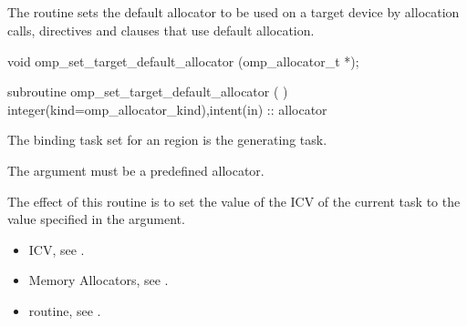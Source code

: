\ccppspecificstart

\subsection{}
\label{subsec:omp_set_target_default_allocator}

\summary
The  routine sets the default allocator to be used on a target device by allocation calls, directives and clauses that use default allocation.

\format
\ccppspecificstart
\begin{boxedcode}
void omp_set_target_default_allocator (omp_allocator_t *);
\end{boxedcode}
\ccppspecificend
\fortranspecificstart
\begin{boxedcode}
subroutine omp_set_target_default_allocator (  )
integer(kind=omp_allocator_kind),intent(in) :: allocator
\end{boxedcode}
\fortranspecificend
\binding
The binding task set for an  region is the generating task.

\constraints

The  argument must be a predefined allocator.

\effect

The effect of this routine is to set the value of the  ICV of the current task to the value specified in the  argument. 

\crossreferences

\begin{itemize}
\item {} ICV, see .
\item Memory Allocators, see .
\item {} routine, see .
\end{itemize}

\subsection{}
\label{subsec:omp_get_target_default_allocator}

